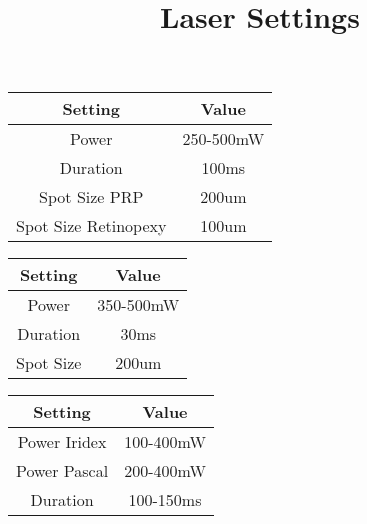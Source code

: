 \documentclass[14pt]{scrartcl}
\title{Laser Settings}
\date{}
\author{}
\begin{document}
\maketitle


\begin{table}[h]
	\centering
	\begin{tabular}{|c|c|}
		\hline
		Setting & Value\\
		\hline
		Power & 250-500mW \\
		\hline
		Duration & 100ms \\
		\hline
		Spot Size PRP & 200um\\
		\hline	
		Spot Size Retinopexy & 100um\\
		\hline
	\end{tabular}
\end{table}


\begin{table}[h]
	\centering
	\begin{tabular}{|c|c|}
		\hline
		Setting & Value\\
		\hline
		Power & 350-500mW \\
		\hline
		Duration & 30ms \\
		\hline
		Spot Size & 200um\\
		\hline
	\end{tabular}
\end{table}


\begin{table}[h]
	\centering
	\begin{tabular}{|c|c|}
		\hline
		Setting & Value\\
		\hline
		Power Iridex & 100-400mW \\
		\hline
		Power Pascal & 200-400mW \\
		\hline
		Duration & 100-150ms \\
		\hline
	\end{tabular}
\end{table}
\end{document}
